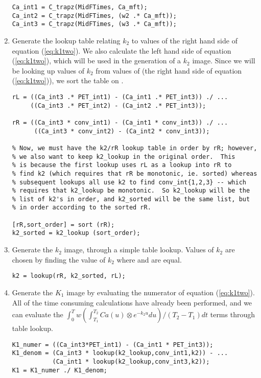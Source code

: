 \begin{enumerate}
\begin{verbatim}
Ca_int1 = C_trapz(MidFTimes, Ca_mft);
Ca_int2 = C_trapz(MidFTimes, (w2 .* Ca_mft));
Ca_int3 = C_trapz(MidFTimes, (w3 .* Ca_mft));
\end{verbatim}

\item Generate the lookup table relating $k_2$ to values of the right
hand side of equation (\ref{eq:k1two}).  We also calculate the left
hand side of equation (\ref{eq:k1two}), which will be used in the
generation of a $k_2$ image.  Since we will be looking up values of
$k_2$ from values of  (the right hand side of equation
(\ref{eq:k1two})), we sort the table on .
\begin{verbatim}
rL = ((Ca_int3 .* PET_int1) - (Ca_int1 .* PET_int3)) ./ ...
     ((Ca_int3 .* PET_int2) - (Ca_int2 .* PET_int3));

rR = ((Ca_int3 * conv_int1) - (Ca_int1 * conv_int3)) ./ ...
      ((Ca_int3 * conv_int2) - (Ca_int2 * conv_int3));

% Now, we must have the k2/rR lookup table in order by rR; however, 
% we also want to keep k2_lookup in the original order.  This
% is because the first lookup uses rL as a lookup into rR to
% find k2 (which requires that rR be monotonic, ie. sorted) whereas
% subsequent lookups all use k2 to find conv_int{1,2,3} -- which 
% requires that k2_lookup be monotonic.  So k2_lookup will be the
% list of k2's in order, and k2_sorted will be the same list, but 
% in order according to the sorted rR.

[rR,sort_order] = sort (rR);
k2_sorted = k2_lookup (sort_order);
\end{verbatim}

\item Generate the $k_2$ image, through a simple table lookup.
Values of $k_2$ are chosen by finding the value of $k_2$ where
 and  are equal.
\begin{verbatim}
k2 = lookup(rR, k2_sorted, rL);
\end{verbatim}

\item Generate the $K_1$ image by evaluating the numerator of
equation (\ref{eq:k1two}).  All of the time consuming calculations
have already been performed, and we can evaluate the $\int_{0}^{T} w
(\int_{T_1}^{T_2} Ca(u) \otimes e^{-k_{2}u} du)/(T_2 - T_1) dt$ terms
through table lookup.
\begin{verbatim}
K1_numer = ((Ca_int3*PET_int1) - (Ca_int1 * PET_int3));
K1_denom = (Ca_int3 * lookup(k2_lookup,conv_int1,k2)) - ...
           (Ca_int1 * lookup(k2_lookup,conv_int3,k2));
K1 = K1_numer ./ K1_denom;
\end{verbatim}


\end{enumerate}
